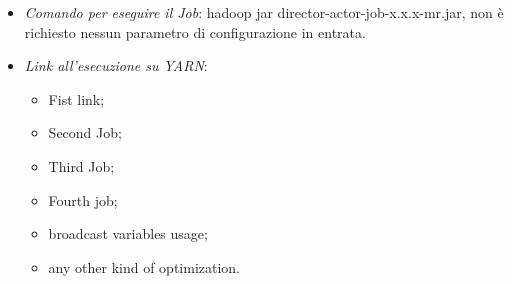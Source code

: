 \documentclass[hidelinks]{article}
\begin{document}
\begin{itemize}
	\item \textit{Comando per eseguire il Job}: hadoop jar director-actor-job-x.x.x-mr.jar, non è richiesto nessun parametro di configurazione in entrata.
	\item \textit{Link all'esecuzione su YARN}:
	\begin{itemize}
		\item Fist link;
		\item Second Job;
		\item Third Job;
		\item Fourth job;
		\item broadcast variables usage;
		\item any other kind of optimization.
	\end{itemize}
	

\end{itemize}
\end{document}

